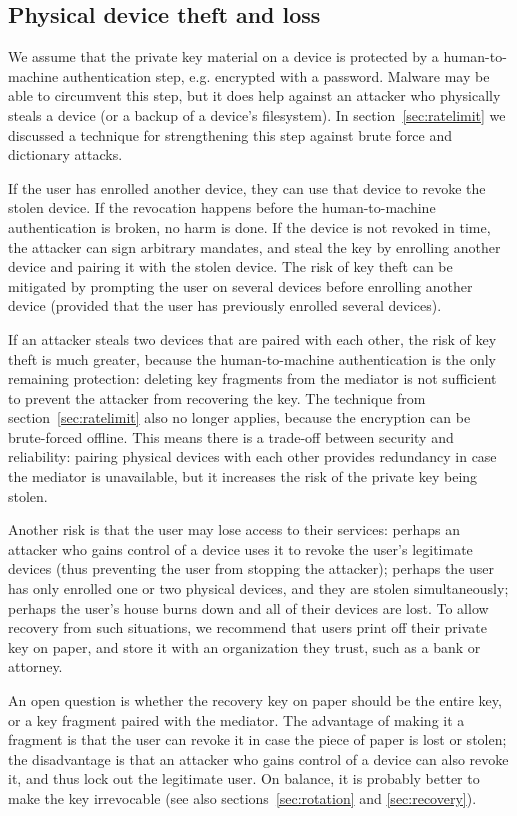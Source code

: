 \subsection{Physical device theft and loss}\label{sec:theftloss}

We assume that the private key material on a device is protected by a human-to-machine
authentication step, e.g. encrypted with a password. Malware may be able to circumvent this step,
but it does help against an attacker who physically steals a device (or a backup of a device's
filesystem). In section~\ref{sec:ratelimit} we discussed a technique for strengthening this step
against brute force and dictionary attacks.

If the user has enrolled another device, they can use that device to revoke the stolen device. If
the revocation happens before the human-to-machine authentication is broken, no harm is done. If the
device is not revoked in time, the attacker can sign arbitrary mandates, and steal the key by
enrolling another device and pairing it with the stolen device. The risk of key theft can be
mitigated by prompting the user on several devices before enrolling another device (provided that
the user has previously enrolled several devices).

If an attacker steals two devices that are paired with each other, the risk of key theft is much
greater, because the human-to-machine authentication is the only remaining protection: deleting key
fragments from the mediator is not sufficient to prevent the attacker from recovering the key.  The
technique from section~\ref{sec:ratelimit} also no longer applies, because the encryption can be
brute-forced offline. This means there is a trade-off between security and reliability: pairing
physical devices with each other provides redundancy in case the mediator is unavailable, but it
increases the risk of the private key being stolen.

Another risk is that the user may lose access to their services: perhaps an attacker who gains
control of a device uses it to revoke the user's legitimate devices (thus preventing the user from
stopping the attacker); perhaps the user has only enrolled one or two physical devices, and they are
stolen simultaneously; perhaps the user's house burns down and all of their devices are lost. To
allow recovery from such situations, we recommend that users print off their private key on paper,
and store it with an organization they trust, such as a bank or attorney.

An open question is whether the recovery key on paper should be the entire key, or a key fragment
paired with the mediator. The advantage of making it a fragment is that the user can revoke it in
case the piece of paper is lost or stolen; the disadvantage is that an attacker who gains control of
a device can also revoke it, and thus lock out the legitimate user. On balance, it is probably
better to make the key irrevocable (see also sections~\ref{sec:rotation} and \ref{sec:recovery}).

